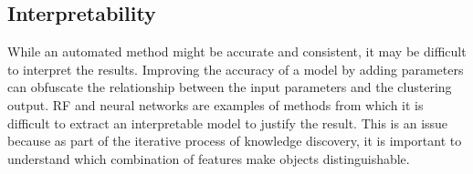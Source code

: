 \subsection{Interpretability}
While an automated method might be accurate and consistent, it may be difficult to interpret the results.
Improving the accuracy of a model by adding parameters can obfuscate the relationship between the input parameters and the clustering output.
\Acrfull{RF} and neural networks are examples of methods from which it is difficult to extract an interpretable model to justify the result.
This is an issue because
as part of the iterative process of knowledge discovery, it is important to understand which combination of features make objects distinguishable.




